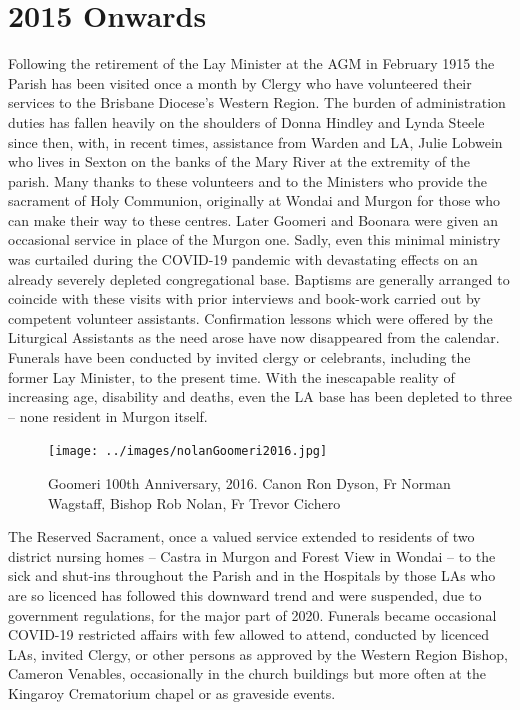 \section{2015 Onwards}



Following the retirement of the Lay Minister at the AGM in February 1915 the Parish has been visited once a month by Clergy who have volunteered their services to the Brisbane Diocese's Western Region. The burden of administration duties has fallen heavily on the shoulders of Donna Hindley and Lynda Steele since then, with, in recent times, assistance from Warden and LA, Julie Lobwein who lives in Sexton on the banks of the Mary River at the extremity of the parish. Many thanks to these volunteers and to the Ministers who provide the sacrament of Holy Communion, originally at Wondai and Murgon for those who can make their way to these centres. Later Goomeri and Boonara were given an occasional service in place of the Murgon one. Sadly, even this minimal ministry was curtailed during the COVID-19 pandemic with devastating effects on an already severely depleted congregational base. Baptisms are generally arranged to coincide with these visits with prior interviews and book-work carried out by competent volunteer assistants. Confirmation lessons which were offered by the Liturgical Assistants as the need arose have now disappeared from the calendar. Funerals have been conducted by invited clergy or celebrants, including the former Lay Minister, to the present time. With the inescapable reality of increasing age, disability and deaths, even the LA base has been depleted to three -- none resident in Murgon itself.









\begin{figure}[!htb]
\begin{center}
\texttt{[image: ../images/nolanGoomeri2016.jpg]}
\caption{Goomeri 100th Anniversary, 2016. Canon Ron Dyson, Fr Norman Wagstaff, Bishop Rob Nolan, Fr Trevor Cichero}
\end{center}
\end{figure}




The Reserved Sacrament, once a valued service extended to residents of two district nursing homes -- Castra in Murgon and Forest View in Wondai -- to the sick and shut-ins throughout the Parish and in the Hospitals by those LAs who are so licenced has followed this downward trend and were suspended, due to government regulations, for the major part of 2020. Funerals became occasional COVID-19 restricted affairs with few allowed to attend, conducted by licenced LAs, invited Clergy, or other persons as approved by the Western Region Bishop, Cameron Venables, occasionally in the church buildings but more often at the Kingaroy Crematorium chapel or as graveside events.



